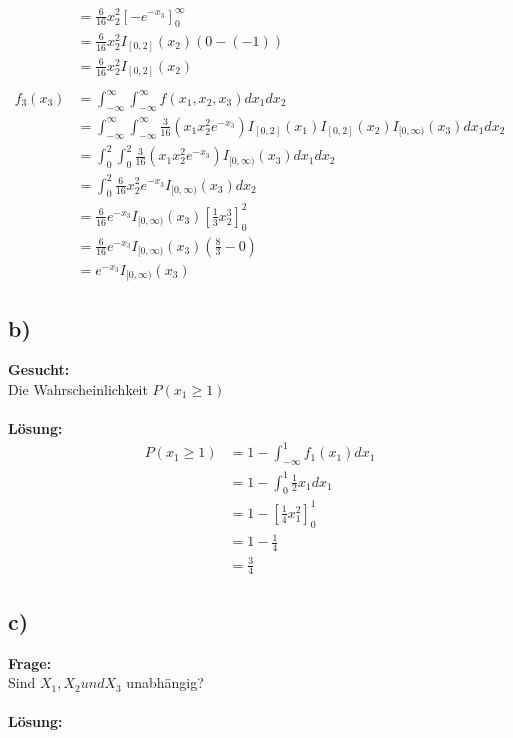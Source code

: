 \documentclass{article}
\begin{document}
\begin{align*}
    &= \frac{6}{16}x_2^2\left[-e^{-x_3}\right]_0^{\infty} \\
    &= \frac{6}{16}x_2^2I_{[0,2]}(x_2)(0 - (-1)) \\
    &= \frac{6}{16}x_2^2I_{[0,2]}(x_2) \\ \\
    f_3(x_3) &= \int_{-\infty}^{\infty}\int_{-\infty}^{\infty} f(x_1, x_2, x_3) dx_1 dx_2 \\
    &= \int_{-\infty}^{\infty}\int_{-\infty}^{\infty} \frac{3}{16}(x_1x_2^2e^{-x_3})I_{[0,2]}(x_1)I_{[0,2]}(x_2)I_{[0, \infty)}(x_3) dx_1 dx_2 \\
    &= \int_{0}^{2}\int_{0}^{2} \frac{3}{16}(x_1x_2^2e^{-x_3})I_{[0,\infty)}(x_3) dx_1 dx_2 \\ 
    &= \int_{0}^{2} \frac{6}{16}x_2^2 e^{-x_3}I_{[0,\infty)}(x_3)dx_2 \\
    &= \frac{6}{16} e^{-x_3}I_{[0,\infty)}(x_3) \left[\frac{1}{3}x_2^3\right]^2_0 \\
    &= \frac{6}{16} e^{-x_3}I_{[0,\infty)}(x_3) (\frac{8}{3}- 0) \\
    &= e^{-x_3}I_{[0,\infty)}(x_3) 
\end{align*}

\subsection*{b)}
\textbf{Gesucht:}\\

Die Wahrscheinlichkeit $P(x_1 \geq 1)$\\\\
\textbf{Lösung:} \\
\begin{align*}
    P(x_1 \geq 1) &= 1 - \int_{-\infty}^{1}f_1(x_1)dx_1 \\
    &= 1 - \int_{0}^{1}\frac{1}{2} x_1 dx_1 \\
    &= 1 - \left[\frac{1}{4} x_1^2 \right]_0^1 \\
    &= 1 - \frac{1}{4} \\ 
    &= \frac{3}{4} 
\end{align*}

\subsection*{c)}
\textbf{Frage:}\\

Sind $X_1, X_2 und X_3$ unabhängig?\\\\
\textbf{Lösung:}\\
\end{document}
